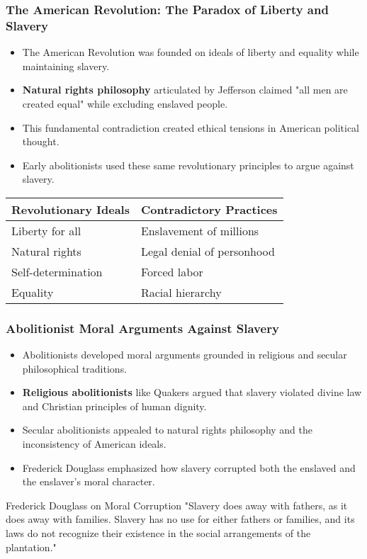 \documentclass{beamer}
\begin{document}
	\begin{frame}
		\frametitle{The American Revolution: The Paradox of Liberty and Slavery}
		
		\begin{itemize}
			\item The American Revolution was founded on ideals of liberty and equality while maintaining slavery.
			\item \textbf{Natural rights philosophy} articulated by Jefferson claimed "all men are created equal" while excluding enslaved people.
			\item This fundamental contradiction created ethical tensions in American political thought.
			\item Early abolitionists used these same revolutionary principles to argue against slavery.
		\end{itemize}
		
		\begin{table}
			\begin{tabular}{ll}
				\toprule
				\textbf{Revolutionary Ideals} & \textbf{Contradictory Practices} \\
				\midrule
				Liberty for all & Enslavement of millions \\
				Natural rights & Legal denial of personhood \\
				Self-determination & Forced labor \\
				Equality & Racial hierarchy \\
				\bottomrule
			\end{tabular}
		\end{table}
		
	\end{frame}
	
	\begin{frame}
		\frametitle{Abolitionist Moral Arguments Against Slavery}
		
		\begin{itemize}
			\item Abolitionists developed moral arguments grounded in religious and secular philosophical traditions.
			\item \textbf{Religious abolitionists} like Quakers argued that slavery violated divine law and Christian principles of human dignity.
			\item Secular abolitionists appealed to natural rights philosophy and the inconsistency of American ideals.
			\item Frederick Douglass emphasized how slavery corrupted both the enslaved and the enslaver's moral character.
		\end{itemize}
		
		\begin{exampleblock}{Frederick Douglass on Moral Corruption}
			"Slavery does away with fathers, as it does away with families. Slavery has no use for either fathers or families, and its laws do not recognize their existence in the social arrangements of the plantation."
		\end{exampleblock}
		
	\end{frame}
	
\end{document}
